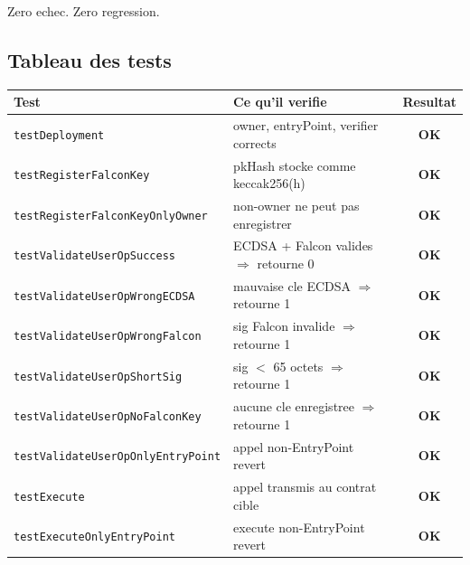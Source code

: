 \documentclass[11pt,a4paper]{article}
\begin{document}
\begin{resultbox}
Zero echec. Zero regression.
\end{resultbox}

\subsection{Tableau des tests}

\begin{center}
\begin{tabular}{llc}
\toprule
\textbf{Test} & \textbf{Ce qu'il verifie} & \textbf{Resultat} \\
\midrule
\texttt{testDeployment}                   & owner, entryPoint, verifier corrects           & \textcolor{pass-green}{\textbf{OK}} \\
\texttt{testRegisterFalconKey}            & pkHash stocke comme keccak256(h)               & \textcolor{pass-green}{\textbf{OK}} \\
\texttt{testRegisterFalconKeyOnlyOwner}   & non-owner ne peut pas enregistrer              & \textcolor{pass-green}{\textbf{OK}} \\
\texttt{testValidateUserOpSuccess}        & ECDSA + Falcon valides $\Rightarrow$ retourne 0 & \textcolor{pass-green}{\textbf{OK}} \\
\texttt{testValidateUserOpWrongECDSA}     & mauvaise cle ECDSA $\Rightarrow$ retourne 1    & \textcolor{pass-green}{\textbf{OK}} \\
\texttt{testValidateUserOpWrongFalcon}    & sig Falcon invalide $\Rightarrow$ retourne 1   & \textcolor{pass-green}{\textbf{OK}} \\
\texttt{testValidateUserOpShortSig}       & sig $<$ 65 octets $\Rightarrow$ retourne 1     & \textcolor{pass-green}{\textbf{OK}} \\
\texttt{testValidateUserOpNoFalconKey}    & aucune cle enregistree $\Rightarrow$ retourne 1 & \textcolor{pass-green}{\textbf{OK}} \\
\texttt{testValidateUserOpOnlyEntryPoint} & appel non-EntryPoint revert                    & \textcolor{pass-green}{\textbf{OK}} \\
\texttt{testExecute}                      & appel transmis au contrat cible                & \textcolor{pass-green}{\textbf{OK}} \\
\texttt{testExecuteOnlyEntryPoint}        & execute non-EntryPoint revert                  & \textcolor{pass-green}{\textbf{OK}} \\

\end{tabular}
\end{center}
\end{document}
